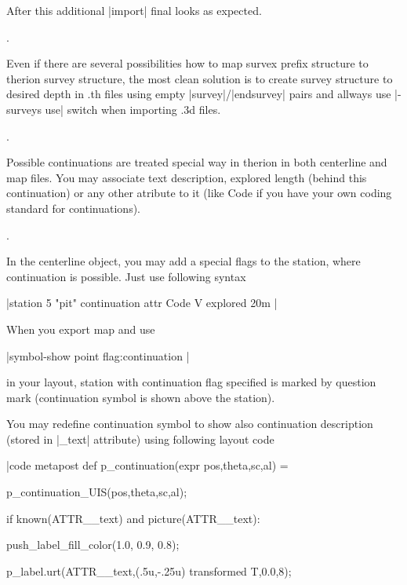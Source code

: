  After this additional |import| final looks as expected.





.


Even if there are several possibilities how to map survex prefix structure
to therion survey structure, the most clean solution is to create
survey structure to desired depth in .th files using empty 
|survey|/|endsurvey| pairs and allways use
|-surveys use| switch when importing .3d files.



.


 Possible continuations are treated special way in therion
 in both centerline and map files. You may associate text
 description, explored length (behind this continuation)
 or any other atribute to it (like Code if you have your
 own coding standard for continuations).


.


 In the centerline object, you may add a special flags to the station,
 where continuation is possible. Just use following syntax


|station 5 "pit" continuation attr Code V explored 20m
|


 When you export map and use


|symbol-show point flag:continuation
|


 in your layout, station with continuation flag specified
 is marked by question mark (continuation
 symbol is shown above the station).







 You may redefine continuation symbol to show also
 continuation description (stored in |_text| 
 attribute) using following layout code


|code metapost
  def p_continuation(expr pos,theta,sc,al) =
  
    p_continuation_UIS(pos,theta,sc,al);

    if known(ATTR__text) and picture(ATTR__text):
    
      push_label_fill_color(1.0, 0.9, 0.8);   
      
      p_label.urt(ATTR__text,(.5u,-.25u) transformed T,0.0,8);      
      
